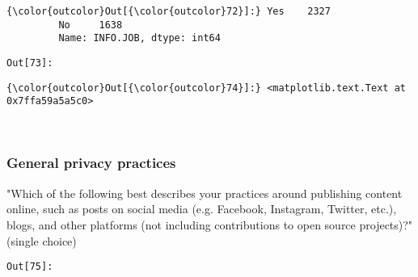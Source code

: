 \documentclass[11pt]{article}
\begin{document}
            \begin{Verbatim}[commandchars=\\\{\}]
{\color{outcolor}Out[{\color{outcolor}72}]:} Yes    2327
         No     1638
         Name: INFO.JOB, dtype: int64
\end{Verbatim}
        
\texttt{\color{outcolor}Out[{\color{outcolor}73}]:}
    

    


            \begin{Verbatim}[commandchars=\\\{\}]
{\color{outcolor}Out[{\color{outcolor}74}]:} <matplotlib.text.Text at 0x7ffa59a5a5c0>
\end{Verbatim}
        
    \begin{center}
    \end{center}
    { \hspace*{\fill} \\}
    
    \subsubsection{General privacy
practices}\label{general-privacy-practices}

"Which of the following best describes your practices around publishing
content online, such as posts on social media (e.g. Facebook, Instagram,
Twitter, etc.), blogs, and other platforms (not including contributions
to open source projects)?" (single choice)

\texttt{\color{outcolor}Out[{\color{outcolor}75}]:}
    
\end{document}
